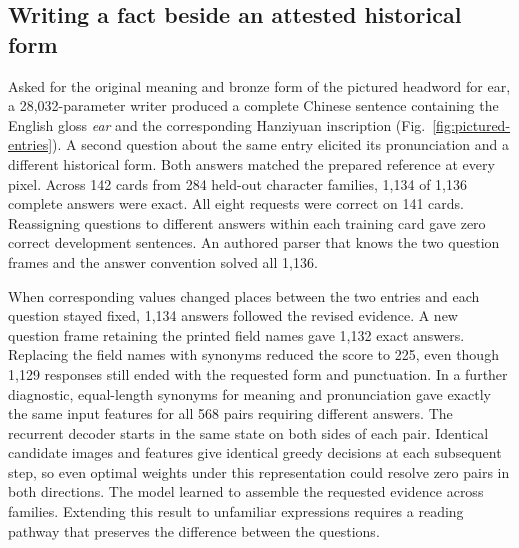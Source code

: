 \subsection*{Writing a fact beside an attested historical form}
Asked for the original meaning and bronze form of the pictured headword for ear, a 28,032-parameter writer produced a complete Chinese sentence containing the English gloss \emph{ear} and the corresponding Hanziyuan inscription (Fig.~\ref{fig:pictured-entries}). A second question about the same entry elicited its pronunciation and a different historical form. Both answers matched the prepared reference at every pixel. Across 142 cards from 284 held-out character families, 1,134 of 1,136 complete answers were exact. All eight requests were correct on 141 cards. Reassigning questions to different answers within each training card gave zero correct development sentences. An authored parser that knows the two question frames and the answer convention solved all 1,136.

When corresponding values changed places between the two entries and each question stayed fixed, 1,134 answers followed the revised evidence. A new question frame retaining the printed field names gave 1,132 exact answers. Replacing the field names with synonyms reduced the score to 225, even though 1,129 responses still ended with the requested form and punctuation. In a further diagnostic, equal-length synonyms for meaning and pronunciation gave exactly the same input features for all 568 pairs requiring different answers. The recurrent decoder starts in the same state on both sides of each pair. Identical candidate images and features give identical greedy decisions at each subsequent step, so even optimal weights under this representation could resolve zero pairs in both directions. The model learned to assemble the requested evidence across families. Extending this result to unfamiliar expressions requires a reading pathway that preserves the difference between the questions.
